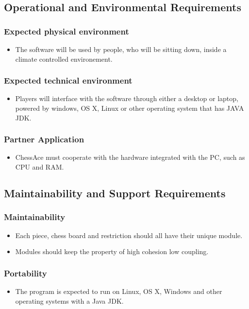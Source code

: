 \documentclass[12pt, titlepage]{article}
\begin{document}
\subsection{Operational and Environmental Requirements}
\subsubsection{Expected physical environment}
\begin{itemize}
\item The software will be used by people, who will be sitting down, inside a climate controlled environement.
\end{itemize}
\subsubsection{Expected technical environment}
\begin{itemize}
\item Players will interface with the software through either a desktop or laptop, powered by windows, OS X, Linux or other operating system that has JAVA JDK.
\end{itemize}
\subsubsection{Partner Application}
\begin{itemize}
\item ChessAce must cooperate with the hardware integrated with the PC, such as CPU and RAM.
\end{itemize}
\subsection{Maintainability and Support Requirements}
\subsubsection{Maintainability}
\begin{itemize}
\item Each piece, chess board and restriction should all have their unique module.
\item Modules should keep the property of high cohesion low coupling.
\end{itemize}
\subsubsection{Portability}
\begin{itemize}
\item The program is expected to run on Linux, OS X, Windows and other operating systems with a Java JDK.
\end{itemize}
\end{document}
